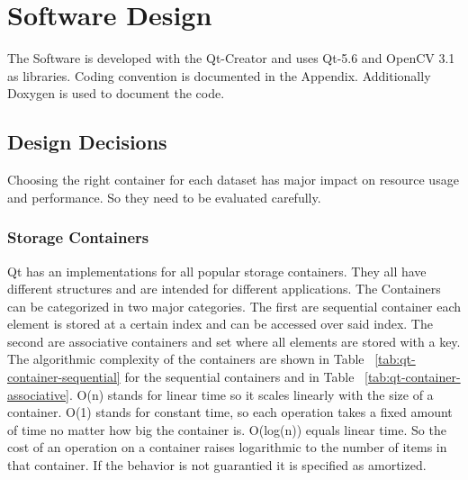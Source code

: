 \chapter{Software Design}
\label{chap:typeareatest}

The Software is developed with the Qt-Creator and uses Qt-5.6 and OpenCV 3.1 as libraries. Coding convention is documented in the Appendix. Additionally Doxygen is used to document the code.

\section{Design Decisions}
\label{sec:typeareatest_typedummytext}

Choosing the right container for each dataset has major impact on resource usage and performance. So they need to be evaluated carefully.

\subsection{Storage Containers}
\label{subsec:satzspiegeltest_typoblindtext_demonstrandum}

Qt has an implementations for all popular storage containers. They all have different structures and are intended for different applications. The Containers can be categorized in two major categories. The first are sequential container each element is stored at a certain index and can be accessed over said index. The second are associative containers and set where all elements are stored with a key. The algorithmic complexity of the  containers are shown in Table ~\ref{tab:qt-container-sequential} for the sequential containers and in Table ~\ref{tab:qt-container-associative}. O(n) stands for linear time so it scales linearly with the size of a container. O(1) stands for constant time, so each operation takes a fixed amount of time no matter how big the container is. O(log(n)) equals linear time. So the cost of an operation on a container raises logarithmic to the number of items in that container. If the behavior is not guarantied it is specified as amortized.


